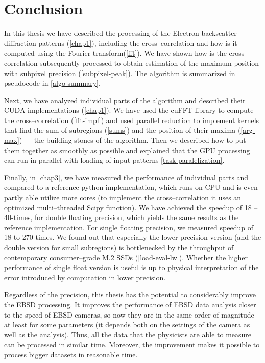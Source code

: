 \chapter*{Conclusion}

In this thesis we have described the processing of the Electron backscatter diffraction patterns (\cref{chap1}), including the cross--correlation and how is it computed using the Fourier transform(\cref{fft}). We have shown how is the cross--correlation subsequently processed to obtain estimation of the maximum position with subpixel precision (\cref{subpixel-peak}). The algorithm is summarized in pseudocode in \cref{algo-summary}.

Next, we have analyzed individual parts of the algorithm and described their CUDA implementations (\cref{chap1}). We have used the cuFFT library to compute the cross--correlation (\cref{fft-impl}) and used parallel reduction to implement kernels that find the sum of subregions (\cref{sums}) and the position of their maxima (\cref{arg-max}) --- the building stones of the algorithm. Then we described how to put them together as smoothly as possible and explained that the GPU processing can run in parallel with loading of input patterns {\cref{task-paralelization}}.

Finally, in \cref{chap3}, we have measured the performance of individual parts and compared to a reference python implementation, which runs on CPU and is even partly able utilize more cores (to implement the cross--correlation it uses an optimized multi--threaded Scipy function). We have achieved the speedup of 18 -- 40-times, for double floating precision, which yields the same results as the reference implementation. For single floating precision, we measured speedup of 18 to 270-times. We found out that especially the lower precision version (and the double version for small subregions) is bottlenecked by the throughput of contemporary consumer--grade M.2 SSDs (\cref{load-eval-lw}). Whether the higher performance of single float version is useful is up to physical interpretation of the error introduced by computation in lower precision.

Regardless of the precision, this thesis has the potential to considerably improve the EBSD processing. It improves the performance of EBSD data analysis closer to the speed of EBSD cameras, so now they are in the same order of magnitude at least for some parameters (it depends both on the settings of the camera as well as the analysis). Thus, all the data that the physicists are able to measure can be processed in similar time. Moreover, the improvement makes it possible to process bigger datasets in reasonable time.


